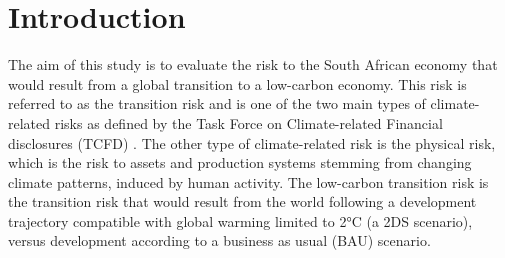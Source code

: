 \documentclass[12pt,english]{article}
\begin{document}

\newcommand{\STAB}[1]{\begin{tabular}{@{}c@{}}#1\end{tabular}}

\tableofcontents

\begin{abstract}

\end{abstract}

\section{Introduction}

The aim of this study is to evaluate %
the risk to the South African economy that would result from a global transition to a low-carbon economy. This risk is referred to as the transition risk and is one of the two main types of climate-related risks as defined by the Task Force on Climate-related Financial disclosures (TCFD) \citep{board2017recommendations}. The other type of climate-related risk is the physical risk, which is the risk to assets and production systems stemming from changing climate patterns, induced by human activity. The low-carbon transition risk is the transition risk that would result from the world following a development trajectory compatible with global warming limited to 2°C (a 2DS scenario), versus development according to a business as usual (BAU) scenario. 
\end{document}
